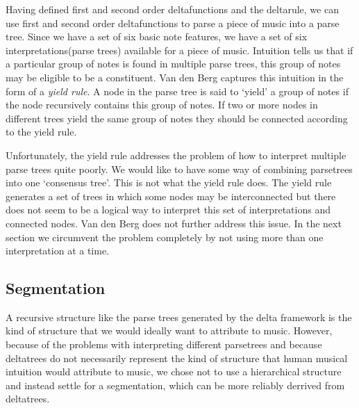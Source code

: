 \documentclass[a4paper,10pt]{article}
\begin{document}
Having defined first and second order deltafunctions and the deltarule, we can use first and second order deltafunctions to parse a piece of music into a parse tree. Since we have a set of six basic note features, we have a set of six interpretations(parse trees) available for a piece of music. Intuition tells us that if a particular group of notes is found in multiple parse trees, this group of notes may be eligible to be a constituent. Van den Berg captures this intuition in the form of a \textit{yield rule}. A node in the parse tree is said to `yield' a group of notes if the node recursively contains this group of notes. If two or more nodes in different trees yield the same group of notes they should be connected according to the yield rule.

Unfortunately, the yield rule addresses the problem of how to interpret multiple parse trees quite poorly. We would like to have some way of combining parsetrees into one `consensus tree'. This is not what the yield rule does. The yield rule generates a set of trees in which some nodes may be interconnected but there does not seem to be a logical way to interpret this set of interpretations and connected nodes. Van den Berg does not further address this issue. In the next section we circumvent the problem completely by not using more than one interpretation at a time.

\subsection{Segmentation}
\label{sec:segmentation}

A recursive structure like the parse trees generated by the delta framework is the kind of structure that we would ideally want to attribute to music. However, because of the problems with interpreting different parsetrees and because deltatrees do not necessarily represent the kind of structure that human musical intuition would attribute to music, we chose not to use a hierarchical structure and instead settle for a segmentation, which can be more reliably derrived from deltatrees.
\end{document}
